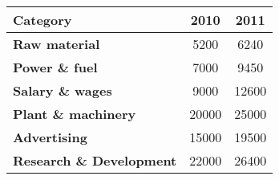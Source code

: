 \begin{tabular}{|l|c|c|}
\hline
     \centering Category & 2010 & 2011 \\
\hline
     \textbf{Raw material}&5200&6240\\
\hline
     \textbf{Power \& fuel }&7000&9450\\
\hline     
     \textbf{Salary \& wages }&9000&12600\\
\hline
     \textbf{Plant \& machinery}&20000&25000\\
\hline
     \textbf{Advertising}&15000&19500\\
\hline
     \textbf{Research \& Development }&22000&26400\\
\hline
\end{tabular}